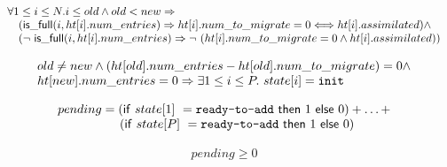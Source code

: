 \begin{lemma}
  \begin{equation*}
    \begin{array}{l}
    \forall 1 \leq i \leq N. i \leq old \wedge old < new \Rightarrow  \\
    \quad (\mathsf{is\_full}(i, \mbox{$ht[i]$}.num\_entries) \Rightarrow \mbox{$ht[i]$}.num\_to\_migrate = 0 \Longleftrightarrow \mbox{$ht[i]$}.assimilated) \wedge \\
    \quad (\mbox{$\neg\ \mathsf{is\_full}(i, \mbox{$ht[i]$}.num\_entries)$} \Rightarrow \mbox{$\neg\ (\mbox{$ht[i]$}.num\_to\_migrate = 0 \wedge \mbox{$ht[i]$}.assimilated)$})
    \end{array}
  \end{equation*}
  \label{num_to_migrate_and_assimilated_in_old_tables}  
\end{lemma}  

\begin{lemma}
  \begin{equation*}
    \begin{array}{l}
      old \neq new \wedge (\mbox{$ht[old]$}.num\_entries - \mbox{$ht[old]$}.num\_to\_migrate) = 0 \wedge \\
      \mbox{$ht[new]$}.num\_entries = 0 \Rightarrow \exists 1 \leq i \leq P.~state[i] = \mbox{\texttt{init}}
    \end{array}
  \end{equation*}
  \label{one_thread_at_init_state_after_migration}
\end{lemma}


\begin{lemma}
  \begin{equation*}
\begin{array}{l}        
  pending = (\mathsf{if}~state[1]~=\mbox{\texttt{ready-to-add}}~ \mathsf{then}~1~\mathsf{else}~0) + \ldots + \\
   \quad \quad \quad \quad \quad (\mathsf{if}~state[P]~= \mbox{\texttt{ready-to-add}}~ \mathsf{then}~1~\mathsf{else}~0)
\end{array}
\end{equation*}  
  \label{pending}
\end{lemma}  

\begin{lemma}
  \begin{equation*}
\begin{array}{l}        
  pending \geq 0
\end{array}
\end{equation*}  
  \label{pending_lb}
\end{lemma}  


